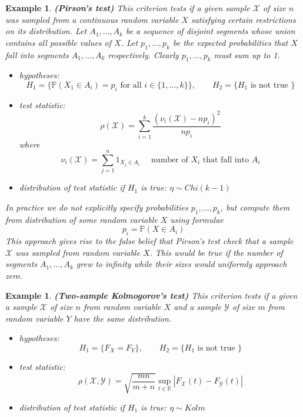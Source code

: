 \documentclass[12pt]{article}
\newtheorem{example}[theorem]{Example}
\begin{document}
\begin{example} \textbf{(Pirson's test)} This criterion tests if a given sample $\mathscr{X}$ of size $n$ was sampled from a continuous random variable $X$ satisfying certain restrictions on its distribution. Let $A_1,\ldots,A_k$ be a sequence of disjoint segments whose union contains all possible values of $X$. Let $p_1,\ldots,p_k$ be the expected probabilities that $X$ fall into segments $A_1,\ldots,A_k$ respectively. Clearly $p_1,\ldots,p_k$ must sum up to 1.
\begin{itemize}
    \item hypotheses: 
    $$H_1=\{\mathbb{P}(X_1\in A_i)=p_i\mbox{ for all } i\in\{1,\ldots,k\}\},\quad\quad H_2=\{H_1\mbox{ is not true }\}$$
    \item test statistic: 
    $$\rho(\mathscr{X})=\sum_{i=1}^k \frac{(\nu_i(\mathscr{X})-np_i)^2}{n p_i}
    $$
    where
    $$
    \nu_i(\mathscr{X})=\sum_{j=1}^n 1_{X_j\in A_i}\quad\mbox{ number of }X_i\mbox{ that fall into }A_i
    $$
    \item distribution of test statistic if $H_1$ is true: $\eta\sim Chi(k-1)$
\end{itemize}
In practice we do not explicitly specify probabilities $p_1,\ldots,p_k$, but compute them from distribution of some random variable $X$ using formulae
$$
p_i=\mathbb{P}(X\in A_i)
$$
This approach gives rise to the false belief that Pirson's test check that a sample $\mathscr{X}$ was sampled from random variable $X$. This would be true if the number of segments $A_1,\ldots,A_k$ grew to infinity while their sizes would uniformly approach zero.
\end{example}

\begin{example} \textbf{(Two-sample Kolmogorov's test)} This criterion tests if a given a sample $\mathscr{X}$ of size $n$ from random variable $X$ and a sample $\mathscr{Y}$ of size $m$ from random variable $Y$ have the same distribution.
\begin{itemize}
    \item hypotheses: 
    $$H_1=\{F_X=F_Y\},\quad\quad H_2=\{H_1\mbox{ is not true }\}$$
    \item test statistic: 
    $$\rho(\mathscr{X},\mathscr{Y})=\sqrt{\frac{mn}{m+n}}\sup_{t\in\mathbb{R}}|F_{\mathscr{X}}(t)-F_{\mathscr{Y}}(t)|$$
    \item distribution of test statistic if $H_1$ is true: $\eta\sim Kolm$
\end{itemize}
\end{example}
\end{document}
